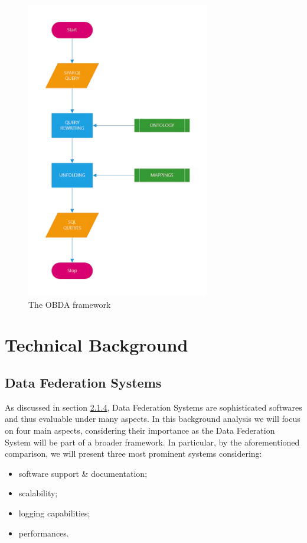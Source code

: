 \begin{figure}[ht]
    \centering
    \includegraphics[width=8cm]{res/obda_framework.png}
    \caption{The OBDA framework}
    \label{fig:OBDAframew}
\end{figure}


\section{Technical Background}
\subsection{Data Federation Systems}
As discussed in section \hyperref[DF]{2.1.4}, Data Federation Systems are sophisticated softwares and thus evaluable under many aspects. In this background analysis we will focus on four main aspects, considering their importance as the Data Federation System will be part of a broader framework. In particular, by the aforementioned comparison, we will present three most prominent systems considering:
\begin{itemize}
    \item software support \& documentation;
    \item scalability;
    \item logging capabilities;
    \item performances.
\end{itemize}


